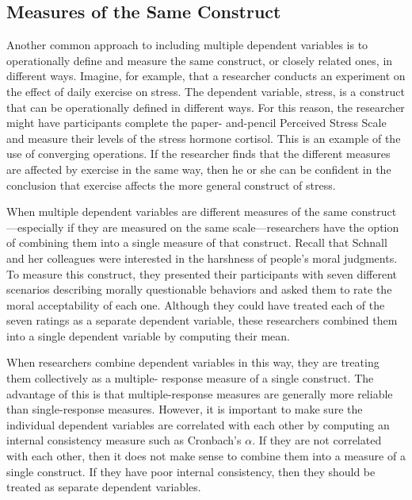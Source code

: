 \subsection{Measures of the Same Construct}

Another common approach to including multiple dependent variables is to operationally define and measure the same construct, or closely related ones, in different ways. Imagine, for example, that a researcher conducts an experiment on the effect of daily exercise on stress. The dependent variable, stress, is a construct that can be operationally defined in different ways. For this reason, the researcher might have participants complete the paper- and-pencil Perceived Stress Scale and measure their levels of the stress hormone cortisol. This is an example of the use of converging operations. If the researcher finds that the different measures are affected by exercise in the same way, then he or she can be confident in the conclusion that exercise affects the more general construct of stress.

When multiple dependent variables are different measures of the same construct---especially if they are measured on the same scale---researchers have the option of combining them into a single measure of that construct. Recall that Schnall and her colleagues were interested in the harshness of people's moral judgments. To measure this construct, they presented their participants with seven different scenarios describing morally questionable behaviors and asked them to rate the moral acceptability of each one. Although they could have treated each of the seven ratings as a separate dependent variable, these researchers combined them into a single dependent variable by computing their mean.

When researchers combine dependent variables in this way, they are treating them collectively as a multiple- response measure of a single construct. The advantage of this is that multiple-response measures are generally more reliable than single-response measures. However, it is important to make sure the individual dependent variables are correlated with each other by computing an internal consistency measure such as Cronbach's $\alpha$. If they are not correlated with each other, then it does not make sense to combine them into a measure of a single construct. If they have poor internal consistency, then they should be treated as separate dependent variables.

